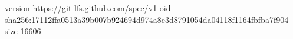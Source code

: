 version https://git-lfs.github.com/spec/v1
oid sha256:17112ffa0513a39b007b924694d974a8e3d8791054da04118f1164fbfba7f904
size 16606
